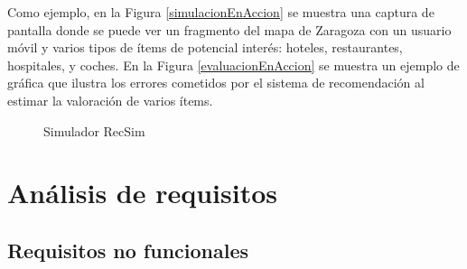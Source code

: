 Como ejemplo, en la Figura \ref{simulacionEnAccion} se muestra una captura de pantalla donde se puede ver un fragmento del mapa de Zaragoza con un usuario móvil y varios tipos de ítems de potencial interés: hoteles, restaurantes, hospitales, y coches. En la Figura \ref{evaluacionEnAccion} se muestra un ejemplo de gráfica que ilustra los errores cometidos por el sistema de recomendación al estimar la valoración de varios ítems.

\begin{figure}[h]
\centering
{}
\caption{Simulador RecSim}
\label{recSim}
\end{figure}

\section{Análisis de requisitos}

\subsection{Requisitos no funcionales}

